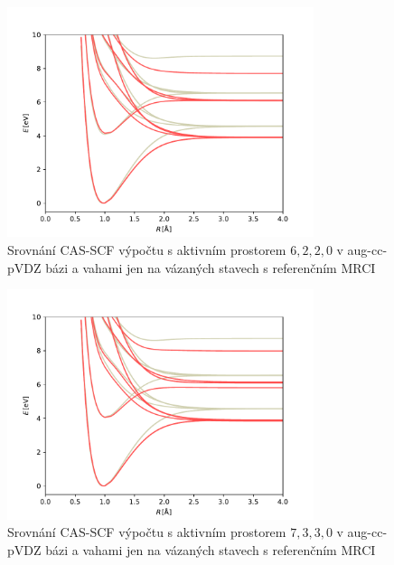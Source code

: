 \begin{figure}
\centering
\includegraphics[width=0.8\textwidth]{../img/OH-MULTI-DZ-6220-w8.pdf}
\caption{Srovnání CAS-SCF výpočtu s aktivním prostorem $6,2,2,0$ v aug-cc-pVDZ bázi  a vahami jen na vázaných stavech s referenčním MRCI}
\label{gr_OH_6220_w}
\end{figure}

\begin{figure}
\centering
\includegraphics[width=0.8\textwidth]{../img/OH-MULTI-DZ-7330-w1.pdf}
\caption{Srovnání CAS-SCF výpočtu s aktivním prostorem $7,3,3,0$ v aug-cc-pVDZ bázi  a vahami jen na vázaných stavech s referenčním MRCI}
\label{gr_OH_7330_w}
\end{figure}